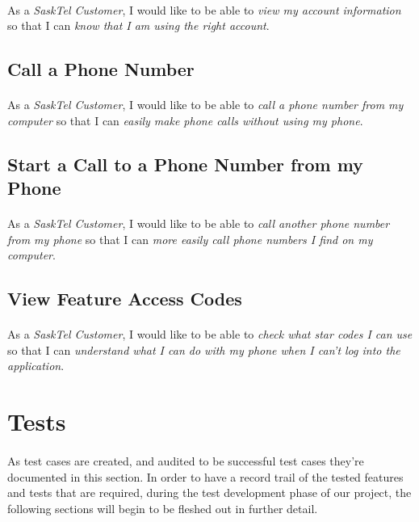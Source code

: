 \documentclass[12pt]{article}
\begin{document}
\paragraph{}	As a \textit{SaskTel Customer}, I would like to be able to \textit{view my account information} so that I can \textit{know that I am using the right account}.

\subsection{Call a Phone Number}
\paragraph{}	As a \textit{SaskTel Customer}, I would like to be able to \textit{call a phone number from my computer} so that I can \textit{easily make phone calls without using my phone}.

\subsection{Start a Call to a Phone Number from my Phone}
\paragraph{}	As a \textit{SaskTel Customer}, I would like to be able to \textit{call another phone number from my phone} so that I can \textit{more easily call phone numbers I find on my computer}.

\subsection{View Feature Access Codes}
\paragraph{}	As a \textit{SaskTel Customer}, I would like to be able to \textit{check what star codes I can use} so that I can \textit{understand what I can do with my phone when I can't log into the application}.




\newpage
\section{Tests}
\paragraph{}	As test cases are created, and audited to be successful test cases they're documented in this section. In order to have a record trail of the tested features and tests that are required, during the test development phase of our project, the following sections will begin to be fleshed out in further detail.
\end{document}
